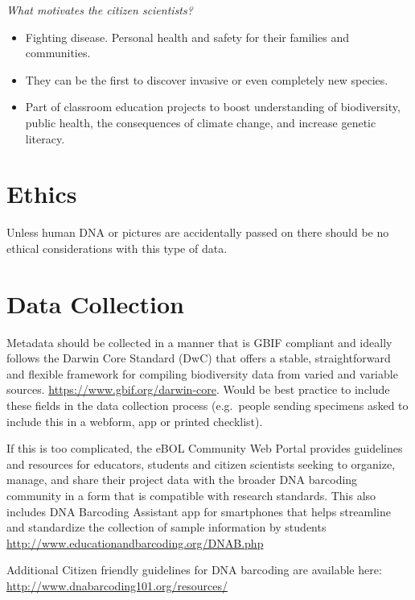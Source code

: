 \documentclass[
]{article}
\providecommand{\tightlist}{%
  \setlength{\itemsep}{0pt}\setlength{\parskip}{0pt}}
\begin{document}
\emph{What motivates the citizen scientists?}

\begin{itemize}
\tightlist
\item
  Fighting disease. Personal health and safety for their families and communities.
\item
  They can be the first to discover invasive or even completely new species.
\item
  Part of classroom education projects to boost understanding of biodiversity, public health, the consequences of climate change, and increase genetic literacy.
\end{itemize}

\hypertarget{ethics}{%
\section{Ethics}\label{ethics}}

Unless human DNA or pictures are accidentally passed on there should be no ethical considerations with this type of data.

\hypertarget{data-collection}{%
\section{Data Collection}\label{data-collection}}

Metadata should be collected in a manner that is GBIF compliant and ideally follows the Darwin Core Standard (DwC) that offers a stable, straightforward and flexible framework for compiling biodiversity data from varied and variable sources. \url{https://www.gbif.org/darwin-core}. Would be best practice to include these fields in the data collection process (e.g.~people sending specimens asked to include this in a webform, app or printed checklist).

If this is too complicated, the eBOL Community Web Portal provides guidelines and resources for educators, students and citizen scientists seeking to organize, manage, and share their project data with the broader DNA barcoding community in a form that is compatible with research standards. This also includes DNA Barcoding Assistant app for smartphones that helps streamline and standardize the collection of sample information by students \url{http://www.educationandbarcoding.org/DNAB.php}

Additional Citizen friendly guidelines for DNA barcoding are available here: \url{http://www.dnabarcoding101.org/resources/}
\end{document}

